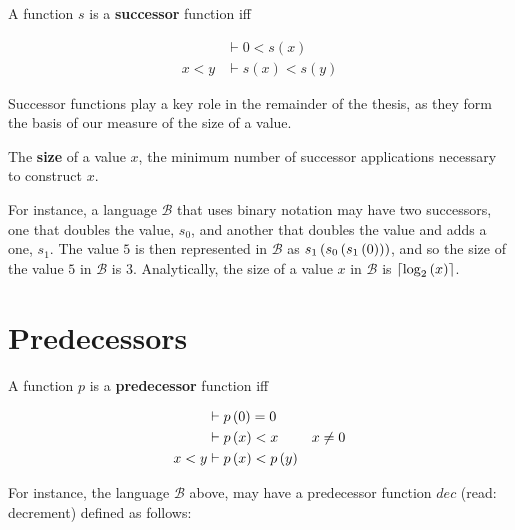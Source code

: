 \begin{definition}

A function $s$ is a \textbf{successor} function iff

\begin{align}
&\vdash 0 < s(x) \\
x < y &\vdash s(x) < s(y)
\end{align}

\end{definition}

Successor functions play a key role in the remainder of the thesis, as they
form the basis of our measure of the size of a value.

\begin{definition}

The \textbf{size} of a value $x$, the minimum number of successor applications
necessary to construct $x$.

\end{definition}

For instance, a language $\mathcal{B}$ that uses binary notation may have two
successors, one that doubles the value, $s_0$, and another that doubles the
value and adds a one, $s_1$. The value $5$ is then represented in $\mathcal{B}$
as $s_1\left({s_0\left({s_1\left({0}\right)}\right)}\right)$, and so the size of the value $5$ in $\mathcal{B}$
is $3$. Analytically, the size of a value $x$ in $\mathcal{B}$ is
$\left\lceil{\log_2\ensuremath{\left({x}\right)}}\right\rceil$.

\section{Predecessors}

\begin{definition}

A function $p$ is a \textbf{predecessor} function iff


\begin{align}
&\vdash p\left({0}\right) = 0 \\
&\vdash p\left({x}\right) < x & x \neq 0 \\
x < y &\vdash p\left({x}\right) < p\left({y}\right)
\end{align}

\end{definition}

For instance, the language $\mathcal{B}$ above, may have a predecessor function
$dec$ (read: decrement) defined as follows:

